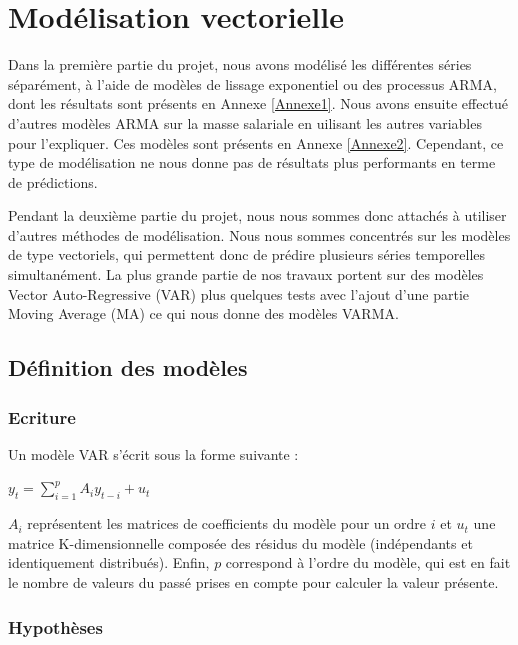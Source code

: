\documentclass[11pt,]{article}
\begin{document}
\newpage

\section{Modélisation vectorielle}\label{modelisation-vectorielle}

Dans la première partie du projet, nous avons modélisé les différentes
séries séparément, à l'aide de modèles de lissage exponentiel ou des
processus ARMA, dont les résultats sont présents en Annexe
\ref{Annexe1}. Nous avons ensuite effectué d'autres modèles ARMA sur la
masse salariale en uilisant les autres variables pour l'expliquer. Ces
modèles sont présents en Annexe \ref{Annexe2}. Cependant, ce type de
modélisation ne nous donne pas de résultats plus performants en terme de
prédictions.

Pendant la deuxième partie du projet, nous nous sommes donc attachés à
utiliser d'autres méthodes de modélisation. Nous nous sommes concentrés
sur les modèles de type vectoriels, qui permettent donc de prédire
plusieurs séries temporelles simultanément. La plus grande partie de nos
travaux portent sur des modèles Vector Auto-Regressive (VAR) plus
quelques tests avec l'ajout d'une partie Moving Average (MA) ce qui nous
donne des modèles VARMA.

\subsection{Définition des modèles}\label{definition-des-modeles}

\subsubsection{Ecriture}\label{ecriture}

Un modèle VAR s'écrit sous la forme suivante :

\(y_t = \sum_{i = 1}^{p} {A_iy_{t-i}} + u_t\)

\(A_i\) représentent les matrices de coefficients du modèle pour un
ordre \(i\) et \(u_t\) une matrice K-dimensionnelle composée des résidus
du modèle (indépendants et identiquement distribués). Enfin, \(p\)
correspond à l'ordre du modèle, qui est en fait le nombre de valeurs du
passé prises en compte pour calculer la valeur présente.

\subsubsection{Hypothèses}\label{hypotheses}
\end{document}
